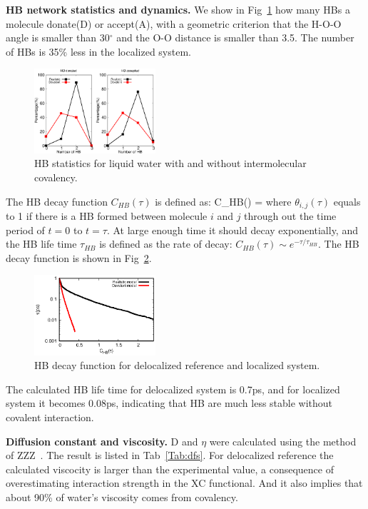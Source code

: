 \documentclass[aps,prl,reprint,amsmath,amssymb]{revtex4-1}
\begin{document}
\textbf{HB network statistics and dynamics.} We show in Fig~\ref{fig:HBstat} how many HBs a molecule donate(D) or accept(A), with a geometric criterion that the H-O-O angle is smaller than 30$^{\circ}$ and the O-O distance is smaller than 3.5\Ang. 
The number of HBs is 35\% less in the localized system.

\begin{figure}
\includegraphics[width=0.4\textwidth]{new_hbstat}
\caption{HB statistics for liquid water with and without intermolecular covalency.}\label{fig:HBstat}
\end{figure}

The HB decay function $C_{HB}(\tau)$ is defined as:
\bea
C_{HB}(\tau) =  \label{Eq:HBdecay}
\eea
where $\theta_{i,j}(\tau)$ equals to 1 if there is a HB formed between molecule $i$ and $j$ through out the time period of $t=0$ to $t=\tau$. 
At large enough time it should decay exponentially, and the HB life time $\tau_{HB}$ is defined as the rate of decay: $C_{HB}(\tau) \sim e^{-\tau/\tau_{HB}}$. 
The HB decay function is shown in Fig~\ref{Fig:HBdecay}.

\begin{figure}
\includegraphics[width=0.4\textwidth]{new_hbdecay}
\caption{HB decay function for delocalized reference and localized system.} \label{Fig:HBdecay}
\end{figure}

The calculated HB life time for delocalized system is 0.7ps, and for localized system it becomes 0.08ps, indicating that HB are much less stable without covalent interaction.
 
 
\textbf{Diffusion constant and viscosity.} D and $\eta$ were calculated using the method of ZZZ~\cite{dunweg1993molecular}. 
The result is listed in Tab~\ref{Tab:dfs}. 
For delocalized reference the calculated viscocity is larger than the experimental value, a consequence of overestimating interaction strength in the XC functional. 
And it also implies that about 90\% of water's viscosity comes from covalency.
\end{document}
